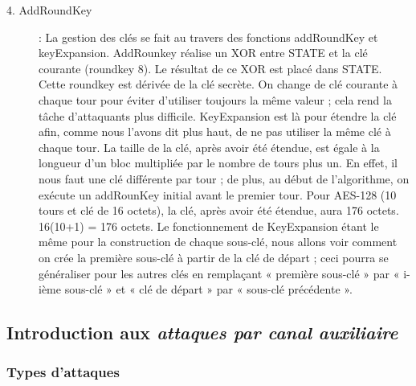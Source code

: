 \documentclass[10pt, oneside, a4paper]{article}
\begin{document}
\begin{description}
\item[4. AddRoundKey] :  La gestion des clés se fait au travers des fonctions addRoundKey et keyExpansion. AddRounkey réalise un XOR entre STATE et la clé courante (roundkey 8). Le résultat de ce XOR est placé dans STATE. Cette roundkey est dérivée de la clé secrète. On change de clé courante à chaque tour pour éviter d’utiliser toujours la même valeur ; cela rend la tâche d’attaquants plus difficile. KeyExpansion est là pour étendre la clé afin, comme nous l’avons dit plus haut, de ne pas utiliser la même clé à chaque tour. La taille de la clé, après avoir été étendue, est égale à la longueur d’un bloc multipliée par le nombre de tours plus un. En effet, il nous faut une clé différente par tour ; de plus, au début de l’algorithme, on exécute un addRounKey initial avant le premier tour. Pour AES-128 (10 tours et clé de 16 octets), la clé, après avoir été étendue, aura 176 octets. 16(10+1) = 176 octets. Le fonctionnement de KeyExpansion étant le même pour la construction de chaque sous-clé, nous allons voir comment on crée la première sous-clé à partir de la clé de départ ; ceci pourra se généraliser pour les autres clés en remplaçant « première sous-clé » par « i-ième sous-clé » et « clé de départ » par « sous-clé précédente ».
\end{description}


\newpage

\subsection{Introduction aux \textit{attaques par canal auxiliaire}}
\label{sec:att}
\subsubsection{Types d'attaques}
\end{document}
